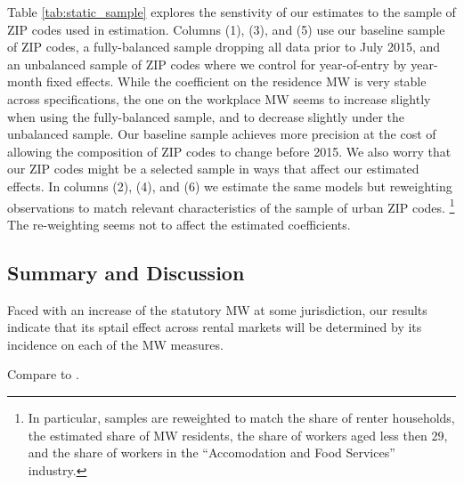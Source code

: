 Table \ref{tab:static_sample} explores the senstivity of our estimates to 
the sample of ZIP codes used in estimation.
Columns (1), (3), and (5) use our baseline sample of ZIP codes, 
a fully-balanced sample dropping all data prior to July 2015, and
an unbalanced sample of ZIP codes where we control for year-of-entry by
year-month fixed effects.
While the coefficient on the residence MW is very stable across specifications,
the one on the workplace MW seems to increase slightly when using the fully-balanced
sample, and to decrease slightly under the unbalanced sample.
Our baseline sample achieves more precision at the cost of allowing the 
composition of ZIP codes to change before 2015.
We also worry that our ZIP codes might be a selected sample in ways that affect
our estimated effects.
In columns (2), (4), and (6) we estimate the same models but reweighting 
observations to match relevant characteristics of the sample of urban 
ZIP codes.%
\footnote{In particular, samples are reweighted to match the share of renter
households, the estimated share of MW residents, the share of workers aged
less then 29, and the share of workers in the ``Accomodation and Food Services''
industry.}
The re-weighting seems not to affect the estimated coefficients.


\subsection{Summary and Discussion}
\label{sec:results_discussion}

Faced with an increase of the statutory MW at some jurisdiction, our results
indicate that its sptail effect across rental markets will be determined by 
its incidence on each of the MW measures.


Compare to \textcite{Yamagishi2019}.
